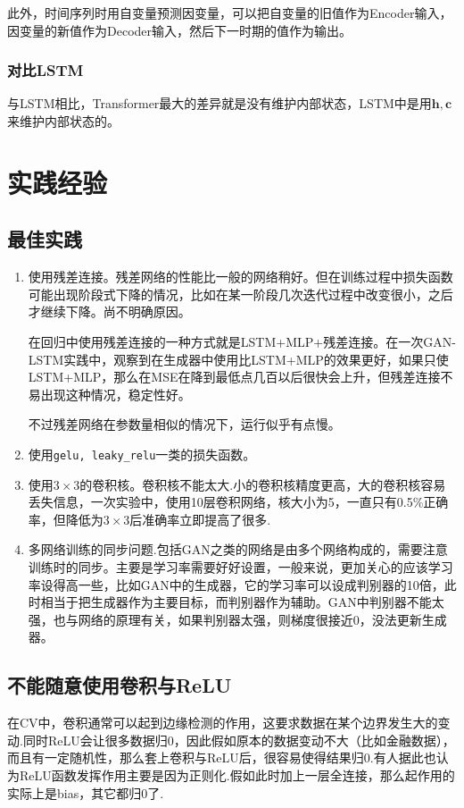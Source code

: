 此外，时间序列时用自变量预测因变量，可以把自变量的旧值作为Encoder输入，因变量的新值作为Decoder输入，然后下一时期的值作为输出。
\subsubsection{对比LSTM}
与LSTM相比，Transformer最大的差异就是没有维护内部状态，LSTM中是用$\bm{h,c}$来维护内部状态的。
\section{实践经验}
\subsection{最佳实践}
\begin{enumerate}
\item 使用残差连接。残差网络的性能比一般的网络稍好。但在训练过程中损失函数可能出现阶段式下降的情况，比如在某一阶段几次迭代过程中改变很小，之后才继续下降。尚不明确原因。

在回归中使用残差连接的一种方式就是LSTM+MLP+残差连接。在一次GAN-LSTM实践中，观察到在生成器中使用比LSTM+MLP的效果更好，如果只使LSTM+MLP，那么在MSE在降到最低点几百以后很快会上升，但残差连接不易出现这种情况，稳定性好。

不过残差网络在参数量相似的情况下，运行似乎有点慢。

\item 使用\texttt{gelu, leaky\_relu}一类的损失函数。
\item 使用$3\times3$的卷积核。卷积核不能太大.小的卷积核精度更高，大的卷积核容易丢失信息，一次实验中，使用10层卷积网络，核大小为5，一直只有0.5\%正确率，但降低为$3\times 3$后准确率立即提高了很多.
\item 多网络训练的同步问题.包括GAN之类的网络是由多个网络构成的，需要注意训练时的同步。主要是学习率需要好好设置，一般来说，更加关心的应该学习率设得高一些，比如GAN中的生成器，它的学习率可以设成判别器的10倍，此时相当于把生成器作为主要目标，而判别器作为辅助。GAN中判别器不能太强，也与网络的原理有关，如果判别器太强，则梯度很接近0，没法更新生成器。
\end{enumerate}


\subsection{不能随意使用卷积与ReLU}
在CV中，卷积通常可以起到边缘检测的作用，这要求数据在某个边界发生大的变动.同时ReLU会让很多数据归0，因此假如原本的数据变动不大（比如金融数据），而且有一定随机性，那么套上卷积与ReLU后，很容易使得结果归0.有人据此也认为ReLU函数发挥作用主要是因为正则化.假如此时加上一层全连接，那么起作用的实际上是bias，其它都归0了.

